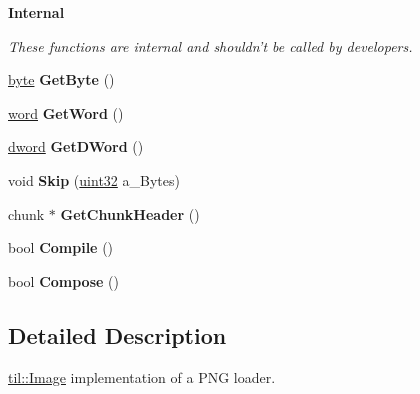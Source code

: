 \begin{Indent}{\bf Internal}\par
{\em These functions are internal and shouldn't be called by developers. }\begin{DoxyCompactItemize}
\item 
\hypertarget{classtil_1_1_image_p_n_g_acfdc45ec9a5a6e20e510290137619aaa}{
\hyperlink{namespacetil_a5f3ec10aca1a788b495a0bd3787bc2dc}{byte} {\bfseries GetByte} ()}
\label{classtil_1_1_image_p_n_g_acfdc45ec9a5a6e20e510290137619aaa}

\item 
\hypertarget{classtil_1_1_image_p_n_g_a34b1fec95bc2360726a037cfda20f799}{
\hyperlink{namespacetil_a7903a6761ac6f7472530b2863401909e}{word} {\bfseries GetWord} ()}
\label{classtil_1_1_image_p_n_g_a34b1fec95bc2360726a037cfda20f799}

\item 
\hypertarget{classtil_1_1_image_p_n_g_abc518dbfc7db53aac8671e1479330789}{
\hyperlink{namespacetil_a9babb870ec6cf9716ed0c90ea12811af}{dword} {\bfseries GetDWord} ()}
\label{classtil_1_1_image_p_n_g_abc518dbfc7db53aac8671e1479330789}

\item 
\hypertarget{classtil_1_1_image_p_n_g_a6c7242e1c3b0082aa5ece3960d560b71}{
void {\bfseries Skip} (\hyperlink{namespacetil_a20db61688ed403d11f057a508d87e54c}{uint32} a\_\-Bytes)}
\label{classtil_1_1_image_p_n_g_a6c7242e1c3b0082aa5ece3960d560b71}

\item 
\hypertarget{classtil_1_1_image_p_n_g_a69775247104a119080ec361277bfe70d}{
chunk $\ast$ {\bfseries GetChunkHeader} ()}
\label{classtil_1_1_image_p_n_g_a69775247104a119080ec361277bfe70d}

\item 
\hypertarget{classtil_1_1_image_p_n_g_ad74bd9c2b9d1e67f3474d4536a3c152f}{
bool {\bfseries Compile} ()}
\label{classtil_1_1_image_p_n_g_ad74bd9c2b9d1e67f3474d4536a3c152f}

\item 
\hypertarget{classtil_1_1_image_p_n_g_a54ee8d423351230d5a70177f29ec09e8}{
bool {\bfseries Compose} ()}
\label{classtil_1_1_image_p_n_g_a54ee8d423351230d5a70177f29ec09e8}

\end{DoxyCompactItemize}
\end{Indent}


\subsection{Detailed Description}
\hyperlink{classtil_1_1_image}{til::Image} implementation of a PNG loader. 

